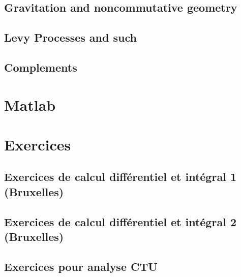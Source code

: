 \chapter{Gravitation and noncommutative geometry}


\chapter{Levy Processes and such}


\chapter{Complements}









\emptyInputPath
{}

\part{Matlab}




\emptyInputPath
{}
\part{Exercices} 





\chapter{Exercices de calcul différentiel et intégral 1 (Bruxelles)}


 
\chapter{Exercices de calcul différentiel et intégral 2 (Bruxelles)}




\chapter{Exercices pour analyse CTU}





\emptyInputPath
{}
 


